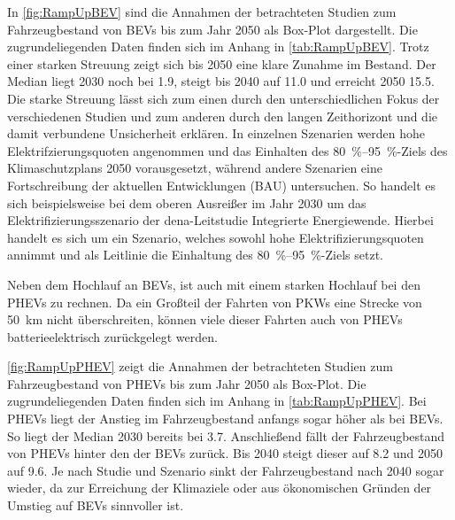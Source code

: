 In \autoref{fig:RampUpBEV} sind die Annahmen der betrachteten Studien zum Fahrzeugbestand von \glspl{BEV} bis zum Jahr \num{2050} als Box-Plot dargestellt.
Die zugrundeliegenden Daten finden sich im Anhang in \autoref{tab:RampUpBEV}.
Trotz einer starken Streuung zeigt sich bis \num{2050} eine klare Zunahme im Bestand.
Der Median liegt 2030 noch bei \SI{1.9}{\MioStk}, steigt bis \num{2040} auf \SI{11.0}{\MioStk} und erreicht \num{2050} \SI{15.5}{\MioStk}.
Die starke Streuung lässt sich zum einen durch den unterschiedlichen Fokus der verschiedenen Studien und zum anderen durch den langen Zeithorizont und die damit verbundene Unsicherheit erklären.
In einzelnen Szenarien werden hohe Elektrifzierungsquoten angenommen und das Einhalten des \SIrange[range-phrase=~{--}~]{80}{95}{\percent}-Ziels des Klimaschutzplans \num{2050} vorausgesetzt, während andere Szenarien eine Fortschreibung der aktuellen Entwicklungen (\gls{BAU}) untersuchen.
So handelt es sich beispielsweise bei dem oberen Ausreißer im Jahr 2030 um das Elektrifizierungsszenario der dena-Leitstudie \glqq Integrierte Energiewende\grqq \cite{DEAGH2018}.
Hierbei handelt es sich um ein Szenario, welches sowohl hohe Elektrifizierungsquoten annimmt und als Leitlinie die Einhaltung des  \SIrange[range-phrase=~{--}~]{80}{95}{\percent}-Ziels setzt.\medskip

Neben dem Hochlauf an \glspl{BEV}, ist auch mit einem starken Hochlauf bei den \glspl{PHEV} zu rechnen.
Da ein Großteil der Fahrten von \glspl{PKW} eine Strecke von \SI{50}{\km} nicht überschreiten, können viele dieser Fahrten auch von \glspl{PHEV} batterieelektrisch zurückgelegt werden. \cite{Agora2019}



\autoref{fig:RampUpPHEV} zeigt die Annahmen der betrachteten Studien zum Fahrzeugbestand von \glspl{PHEV} bis zum Jahr \num{2050} als Box-Plot.
Die zugrundeliegenden Daten finden sich im Anhang in \autoref{tab:RampUpPHEV}.
Bei \glspl{PHEV} liegt der Anstieg im Fahrzeugbestand anfangs sogar höher als bei \glspl{BEV}.
So liegt der Median 2030 bereits bei \SI{3.7}{\MioStk}.
Anschließend fällt der Fahrzeugbestand von \glspl{PHEV} hinter den der \glspl{BEV} zurück.
Bis \num{2040} steigt dieser auf \SI{8.2}{\MioStk} und \num{2050} auf \SI{9.6}{\MioStk}.
Je nach Studie und Szenario sinkt der Fahrzeugbestand nach \num{2040} sogar wieder, da zur Erreichung der Klimaziele oder aus ökonomischen Gründen der Umstieg auf \glspl{BEV} sinnvoller ist.


